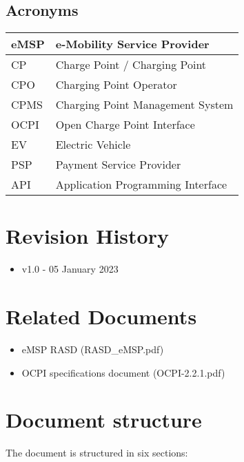 \subsection{Acronyms}
\begin{tabular}{|l|l|}
	\hline
	eMSP & e-Mobility Service Provider\\
	\hline
	CP & Charge Point / Charging Point\\
	\hline
	CPO & Charging Point Operator\\
	\hline
	CPMS & Charging Point Management System\\
	\hline
	OCPI & Open Charge Point Interface\\
	\hline
	EV & Electric Vehicle\\
	\hline
	PSP & Payment Service Provider\\
	\hline
	API & Application Programming Interface\\
	\hline
\end{tabular}


\section{Revision History}
\begin{itemize}
	\item v1.0 - 05 January 2023
\end{itemize}

\section{Related Documents}
\begin{itemize}
	\item {eMSP RASD (RASD\_eMSP.pdf)}
	\item OCPI specifications document (OCPI-2.2.1.pdf)
\end{itemize}

\section{Document structure}
The document is structured in six sections:

